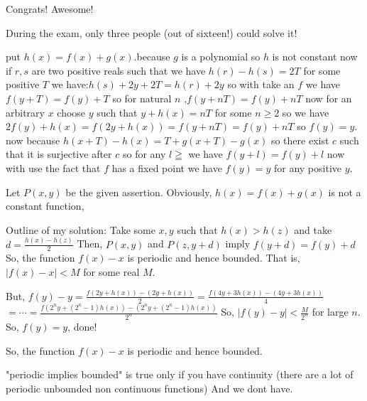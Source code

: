 \begin{solution}
	Congrats! Awesome!

During the exam, only three people (out of sixteen!) could solve it!
\end{solution}



\begin{solution}
	put $h(x)=f(x)+g(x)$.because $g$ is a polynomial so $h$ is not constant now if $r,s$ are two positive reals such that we have $h(r)-h(s)=2T$ for some positive $T$ we have:$h(s)+2y+2T=h(r)+2y$ so with take an $f$ we have $f(y+T)=f(y)+T$ so for natural $n$ ,$f(y+nT)=f(y)+nT$ now for an arbitrary $x$ choose $y$ such that $y+h(x)=nT$ for some $n\geq2$ so we have $2f(y)+h(x)=f(2y+h(x))=f(y+nT)=f(y)+nT$ so $f(y)=y$.
now because $h(x+T)-h(x)=T+g(x+T)-g(x)$ so there exist $c$ such that it is surjective after $c$ so for any $l\geqq$ we have $f(y+l)=f(y)+l$ now with use the fact that $f$ has a fixed point we have $f(y)=y$ for any positive $y$.
\end{solution}



\begin{solution}
	Let $P(x,y)$ be the given assertion. Obviously, $h(x)=f(x)+g(x)$ is not a constant function,

Outline of my solution:
Take some $x, y$ such that $h(x)>h(z)$ and take $d=\frac{h(x)-h(z)}{2}$
Then, $P(x,y)$ and $P(z,y+d)$ imply $f(y+d)=f(y)+d$
So, the function $f(x)-x$ is periodic and hence bounded.
That is, $|f(x)-x|<M$ for some real $M$.

But, $f(y)-y=\frac{f(2y+h(x))-(2y+h(x))}{2}=\frac{f(4y+3h(x))-(4y+3h(x))}{4}$
$=\cdots =\frac{f(2^n y + (2^n - 1)h(x)) - (2^n y + (2^n - 1)h(x)) }{2^n}$
So, $|f(y)-y|<\frac{M}{2^n}$  for large $n$.
So, $f(y)=y$, done!
\end{solution}



\begin{solution}
	\begin{tcolorbox}So, the function $f(x)-x$ is periodic and hence bounded.\end{tcolorbox}
"periodic implies bounded" is true only if you have continuity (there are a lot of periodic unbounded non continuous functions)
And we dont have.
\end{solution}



